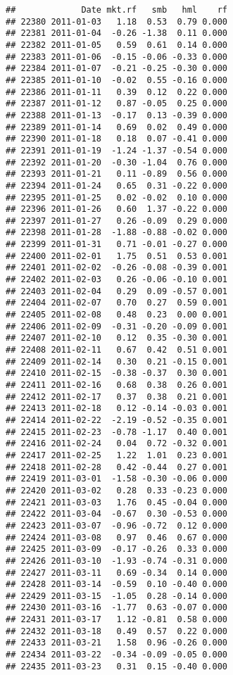 \documentclass[
]{article}
\begin{document}
\begin{verbatim}
##             Date mkt.rf   smb   hml    rf
## 22380 2011-01-03   1.18  0.53  0.79 0.000
## 22381 2011-01-04  -0.26 -1.38  0.11 0.000
## 22382 2011-01-05   0.59  0.61  0.14 0.000
## 22383 2011-01-06  -0.15 -0.06 -0.33 0.000
## 22384 2011-01-07  -0.21 -0.25 -0.30 0.000
## 22385 2011-01-10  -0.02  0.55 -0.16 0.000
## 22386 2011-01-11   0.39  0.12  0.22 0.000
## 22387 2011-01-12   0.87 -0.05  0.25 0.000
## 22388 2011-01-13  -0.17  0.13 -0.39 0.000
## 22389 2011-01-14   0.69  0.02  0.49 0.000
## 22390 2011-01-18   0.18  0.07 -0.41 0.000
## 22391 2011-01-19  -1.24 -1.37 -0.54 0.000
## 22392 2011-01-20  -0.30 -1.04  0.76 0.000
## 22393 2011-01-21   0.11 -0.89  0.56 0.000
## 22394 2011-01-24   0.65  0.31 -0.22 0.000
## 22395 2011-01-25   0.02 -0.02  0.10 0.000
## 22396 2011-01-26   0.60  1.37 -0.22 0.000
## 22397 2011-01-27   0.26 -0.09  0.29 0.000
## 22398 2011-01-28  -1.88 -0.88 -0.02 0.000
## 22399 2011-01-31   0.71 -0.01 -0.27 0.000
## 22400 2011-02-01   1.75  0.51  0.53 0.001
## 22401 2011-02-02  -0.26 -0.08 -0.39 0.001
## 22402 2011-02-03   0.26 -0.06 -0.10 0.001
## 22403 2011-02-04   0.29  0.09 -0.57 0.001
## 22404 2011-02-07   0.70  0.27  0.59 0.001
## 22405 2011-02-08   0.48  0.23  0.00 0.001
## 22406 2011-02-09  -0.31 -0.20 -0.09 0.001
## 22407 2011-02-10   0.12  0.35 -0.30 0.001
## 22408 2011-02-11   0.67  0.42  0.51 0.001
## 22409 2011-02-14   0.30  0.21 -0.15 0.001
## 22410 2011-02-15  -0.38 -0.37  0.30 0.001
## 22411 2011-02-16   0.68  0.38  0.26 0.001
## 22412 2011-02-17   0.37  0.38  0.21 0.001
## 22413 2011-02-18   0.12 -0.14 -0.03 0.001
## 22414 2011-02-22  -2.19 -0.52 -0.35 0.001
## 22415 2011-02-23  -0.78 -1.17  0.40 0.001
## 22416 2011-02-24   0.04  0.72 -0.32 0.001
## 22417 2011-02-25   1.22  1.01  0.23 0.001
## 22418 2011-02-28   0.42 -0.44  0.27 0.001
## 22419 2011-03-01  -1.58 -0.30 -0.06 0.000
## 22420 2011-03-02   0.28  0.33 -0.23 0.000
## 22421 2011-03-03   1.76  0.45 -0.04 0.000
## 22422 2011-03-04  -0.67  0.30 -0.53 0.000
## 22423 2011-03-07  -0.96 -0.72  0.12 0.000
## 22424 2011-03-08   0.97  0.46  0.67 0.000
## 22425 2011-03-09  -0.17 -0.26  0.33 0.000
## 22426 2011-03-10  -1.93 -0.74 -0.31 0.000
## 22427 2011-03-11   0.69 -0.34  0.14 0.000
## 22428 2011-03-14  -0.59  0.10 -0.40 0.000
## 22429 2011-03-15  -1.05  0.28 -0.14 0.000
## 22430 2011-03-16  -1.77  0.63 -0.07 0.000
## 22431 2011-03-17   1.12 -0.81  0.58 0.000
## 22432 2011-03-18   0.49  0.57  0.22 0.000
## 22433 2011-03-21   1.58  0.96 -0.26 0.000
## 22434 2011-03-22  -0.34 -0.09 -0.05 0.000
## 22435 2011-03-23   0.31  0.15 -0.40 0.000

\end{verbatim}
\end{document}
